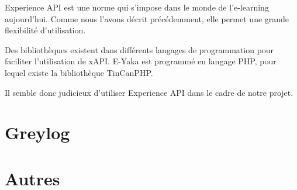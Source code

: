             Experience API est une norme qui s’impose dans le monde de l’e-learning aujourd’hui. Comme nous l’avons décrit précédemment, elle permet une grande flexibilité d’utilisation.

            Des bibliothèques existent dans différents langages de programmation pour faciliter l’utilisation de xAPI. E-Yaka est programmé en langage PHP, pour lequel existe la bibliothèque TinCanPHP.

            Il semble donc judicieux d’utiliser Experience API dans le cadre de notre projet.


    \section{Greylog  }
    \section{Autres  }
